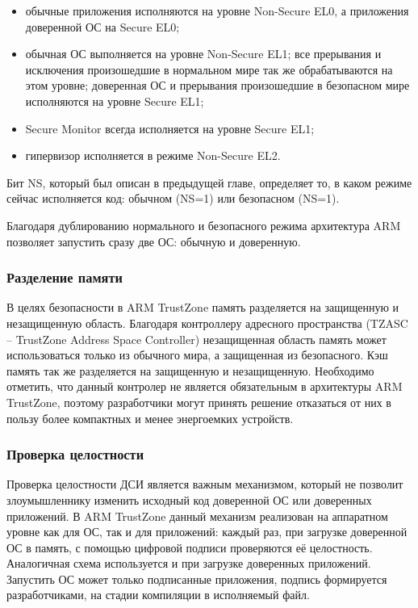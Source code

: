 \begin{itemize}
	\item обычные приложения исполняются на уровне Non-Secure EL0, а приложения доверенной ОС на Secure EL0;
	\item обычная ОС выполняется на уровне Non-Secure EL1; все прерывания и исключения произошедшие в нормальном мире так же обрабатываются на этом уровне; доверенная ОС и прерывания произошедшие в безопасном мире исполняются на уровне Secure EL1;
	\item Secure Monitor всегда исполняется на уровне Secure EL1;
	\item гипервизор исполняется в режиме Non-Secure EL2.
\end{itemize}

Бит NS, который был описан в предыдущей главе, определяет то, в каком режиме сейчас исполняется код: обычном (NS=1) или безопасном (NS=1).

Благодаря дублированию нормального и безопасного режима архитектура ARM позволяет запустить сразу две ОС: обычную и доверенную.

\subsubsection{Разделение памяти}

В целях безопасности в ARM TrustZone память разделяется на защищенную и незащищенную область. Благодаря контроллеру адресного пространства (TZASC -- TrustZone Address Space Controller) незащищенная область память может использоваться только из обычного мира, а защищенная из безопасного. Кэш память так же разделяется на защищенную и незащищенную. Необходимо отметить, что данный контролер не является обязательным в архитектуры ARM TrustZone, поэтому разработчики могут принять решение отказаться от них в пользу более компактных и менее энергоемких устройств.

\subsubsection{Проверка целостности}

Проверка целостности ДСИ является важным механизмом, который не позволит злоумышленнику изменить исходный код доверенной ОС или доверенных приложений. В ARM TrustZone данный механизм реализован на аппаратном уровне как для ОС, так и для приложений: каждый раз, при загрузке доверенной ОС в память, с помощью цифровой подписи проверяются её целостность. Аналогичная схема используется и при загрузке доверенных приложений. Запустить ОС может только подписанные приложения, подпись формируется разработчиками, на стадии компиляции в исполняемый файл.

